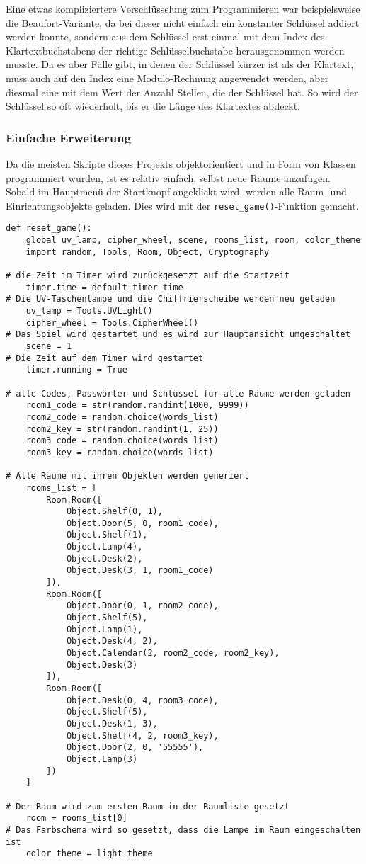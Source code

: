 Eine etwas kompliziertere Verschlüsselung zum Programmieren war beispielsweise die Beaufort-Variante, da bei dieser nicht einfach ein konstanter Schlüssel addiert werden konnte, sondern aus dem Schlüssel erst einmal mit dem Index des Klartextbuchstabens der richtige Schlüsselbuchstabe herausgenommen werden musste. Da es aber Fälle gibt, in denen der Schlüssel kürzer ist als der Klartext, muss auch auf den Index eine Modulo-Rechnung angewendet werden, aber diesmal eine mit dem Wert der Anzahl Stellen, die der Schlüssel hat. So wird der Schlüssel so oft wiederholt, bis er die Länge des Klartextes abdeckt.

\subsubsection{Einfache Erweiterung}
Da die meisten Skripte dieses Projekts objektorientiert und in Form von Klassen programmiert wurden, ist es relativ einfach, selbst neue Räume anzufügen. Sobald im Hauptmenü der Startknopf angeklickt wird, werden alle Raum- und Einrichtungsobjekte geladen. Dies wird mit der \verb+reset_game()+-Funktion gemacht. 

\begin{Verbatim}
def reset_game():
    global uv_lamp, cipher_wheel, scene, rooms_list, room, color_theme
    import random, Tools, Room, Object, Cryptography

# die Zeit im Timer wird zurückgesetzt auf die Startzeit
    timer.time = default_timer_time 
# Die UV-Taschenlampe und die Chiffrierscheibe werden neu geladen
    uv_lamp = Tools.UVLight()
    cipher_wheel = Tools.CipherWheel() 
# Das Spiel wird gestartet und es wird zur Hauptansicht umgeschaltet
    scene = 1 
# Die Zeit auf dem Timer wird gestartet
    timer.running = True 

# alle Codes, Passwörter und Schlüssel für alle Räume werden geladen
    room1_code = str(random.randint(1000, 9999))
    room2_code = random.choice(words_list)
    room2_key = str(random.randint(1, 25))
    room3_code = random.choice(words_list)
    room3_key = random.choice(words_list) 

# Alle Räume mit ihren Objekten werden generiert
    rooms_list = [ 
        Room.Room([
            Object.Shelf(0, 1),
            Object.Door(5, 0, room1_code),
            Object.Shelf(1),
            Object.Lamp(4),
            Object.Desk(2),
            Object.Desk(3, 1, room1_code)
        ]),
        Room.Room([
            Object.Door(0, 1, room2_code),
            Object.Shelf(5),
            Object.Lamp(1),
            Object.Desk(4, 2),
            Object.Calendar(2, room2_code, room2_key),
            Object.Desk(3)
        ]),
        Room.Room([
            Object.Desk(0, 4, room3_code),
            Object.Shelf(5),
            Object.Desk(1, 3),
            Object.Shelf(4, 2, room3_key),
            Object.Door(2, 0, '55555'),
            Object.Lamp(3)
        ])
    ]

# Der Raum wird zum ersten Raum in der Raumliste gesetzt
    room = rooms_list[0] 
# Das Farbschema wird so gesetzt, dass die Lampe im Raum eingeschalten ist
    color_theme = light_theme
\end{Verbatim}

